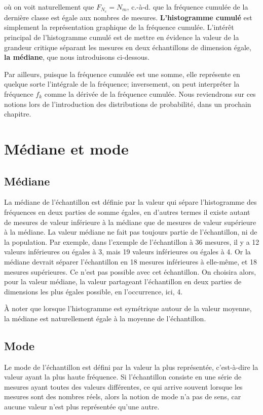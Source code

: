 où on voit naturellement que $F_{N_c}=N_m$, c.-à-d. que la fréquence cumulée de la dernière classe est égale aux nombres de mesures. \textbf{L'histogramme cumulé} est simplement la représentation graphique de la fréquence cumulée. L'intérêt principal de l'histogramme cumulé est de mettre en évidence la valeur de la grandeur critique séparant les mesures en deux échantillons de dimension égale, \textbf{la médiane}, que nous introduisons ci-dessous.

Par ailleurs, puisque la fréquence cumulée est une somme, elle représente en quelque sorte l'intégrale de la fréquence; inversement, on peut interpréter la fréquence $f_k$ comme la dérivée de la fréquence cumulée. Nous reviendrons sur ces notions lors de l'introduction des distributions de probabilité, dans un prochain chapitre.

\section{Médiane et mode}

\subsection{Médiane}

La médiane de l'échantillon est définie par la valeur qui sépare l'histogramme des fréquences en deux parties de somme égales, en d'autres termes il existe autant de mesures de valeur inférieure à la médiane que de mesures de valeur supérieure à la médiane. La valeur médiane ne fait pas toujours partie de l'échantillon, ni de la population. Par exemple, dans l'exemple de l'échantillon à 36 mesures, il y a 12 valeurs inférieures ou égales à 3, mais 19 valeurs inférieures ou égales à 4. Or la médiane devrait séparer l'échantillon en 18 mesures inférieures à elle-même, et 18 mesures supérieures. Ce n'est pas possible avec cet échantillon. On choisira alors, pour la valeur médiane, la valeur partageant l'échantillon en deux parties de dimensions les plus égales possible, en l'occurrence, ici, 4.

À noter que lorsque l'histogramme est symétrique autour de la valeur moyenne, la médiane est naturellement égale à la moyenne de l'échantillon.

\subsection{Mode}

Le mode de l'échantillon est défini par la valeur la plus représentée, c'est-à-dire la valeur ayant la plus haute fréquence. Si l'échantillon consiste en une série de mesures ayant toutes des valeurs différentes, ce qui arrive souvent lorsque les mesures sont des nombres réels, alors la notion de mode n'a pas de sens, car aucune valeur n'est plus représentée qu'une autre.

